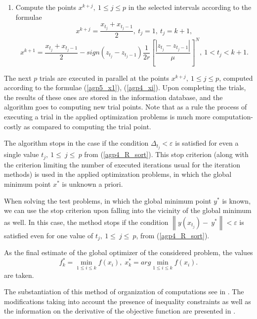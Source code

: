 \documentclass{svproc}
\begin{document}
\begin{enumerate}
	\item Compute the points $x^{k+j},\ 1\leq j\leq p$ in the selected intervals according to the formulae
\begin{equation}
	\label{agp5_x1}
	x^{k+j}=\frac{x_{t_j}+x_{t_j-1}}{2},\ t_j=1,\ t_j=k+1,
\end{equation}	
\begin{equation}
	\label{agp4_xi}	
	x^{k+1}=\frac{x_{t_j}+x_{t_j-1}}{2}-sign\left(z_{t_j}-z_{t_j-1}\right)\frac{1}{2r}\left[\frac{\left|z_{t_j}-z_{t_j-1}\right|}{\mu}\right]^N,\ 1<t_j<k+1.
\end{equation}
	
\end{enumerate}

The next $p$ trials are executed in parallel at the points $x^{k+j},\ 1\leq j\leq p$, computed according  to the formulae (\ref{agp5_x1}), (\ref{agp4_xi}). Upon completing the trials, the results of these ones  are stored in the information database, and the algorithm goes to computing new trial points.
Note that as a rule the process of executing a trial in the applied optimization problems is much more  computation-costly as compared to computing the trial point.

The algorithm stops in the case if the condition \(\Delta_{t_j} < \varepsilon\) is satisfied for even a  single value $t_j,\ 1\le\ j\le\ p$ from (\ref{agp4_R_sort}). This stop criterion (along with the criterion limiting the number of executed iterations usual for the  iteration methods) is used in the applied optimization problems, in which the global minimum point $x^*$ is unknown a priori. 

When solving the test problems, in which the global minimum point $y^*$ is known, we can use the stop criterion upon falling into the vicinity of the global minimum as well. In this case, the method  stops if the condition $\left\|y(x_{t_j})-\ y^\ast\right\| < \varepsilon$ is satisfied even for one value of $t_j,\  1\le\ j\le\ p$, from (\ref{agp4_R_sort}). 

As the final estimate of the global optimizer of the considered problem, the values 
\begin{equation} 
	f_k^*=\min_{1\leq i \leq k}f(x_i), \; x_k^*=arg \min_{1\leq i \leq k}f(x_i). 
\end{equation} 
are taken. 

The substantiation of this method of organization of computations see in \cite{fio_bib20}. The  modifications taking into account the presence of inequality constraints as well as the information on the derivative of the objective function are presented in \cite{fio_bib12, fio_bib9,  fio_bib11}.
\end{document}
